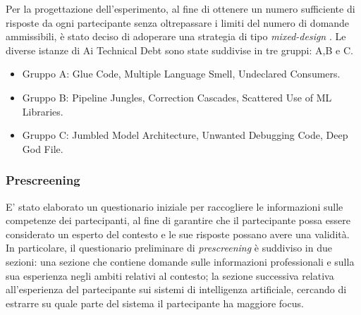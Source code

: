 Per la progettazione dell'esperimento, al fine di ottenere un numero sufficiente di risposte da ogni partecipante senza oltrepassare i limiti del numero di domande ammissibili, è stato deciso di adoperare una strategia di tipo \textit{mixed-design} \cite{AtzmullerVignetta}.
Le diverse istanze di Ai Technical Debt sono state suddivise in tre gruppi: A,B e C.
\begin{itemize}
    \item Gruppo A: Glue Code, Multiple Language Smell, Undeclared Consumers.    \item Gruppo B: Pipeline Jungles, Correction Cascades, Scattered Use of ML Libraries.
    \item Gruppo C: Jumbled Model Architecture, Unwanted Debugging Code, Deep God File.
\end{itemize}

\subsubsection{Prescreening}
E' stato elaborato un questionario iniziale per raccogliere le informazioni sulle competenze dei partecipanti, al fine di garantire che il partecipante possa essere considerato un esperto del contesto e le sue risposte possano avere una validità.
In particolare, il questionario preliminare di \textit{prescreening} è suddiviso in due sezioni: una sezione che contiene domande sulle informazioni professionali e sulla sua esperienza negli ambiti relativi al contesto; la sezione successiva relativa all'esperienza del partecipante sui sistemi di intelligenza artificiale, cercando di estrarre su quale parte del sistema il partecipante ha maggiore focus.

